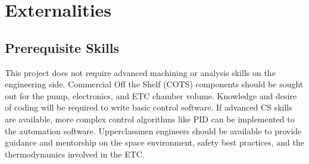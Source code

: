 \documentclass[conference]{IEEEtran} %
\begin{document}


\section{Externalities}
\subsection{Prerequisite Skills}
  This project does not require advanced machining or analysis skills on the engineering side. Commercial Off the Shelf (COTS) components should be sought out for the pump, electronics, and ETC chamber volume.
  Knowledge and desire of coding will be required to write basic control software. If advanced CS skills are available, more complex control algorithms like PID can be implemented to the automation software.
  Upperclassmen engineers should be available to provide guidance and mentorship on the space environment, safety best practices, and the thermodynamics involved in the ETC.
  
\end{document}
